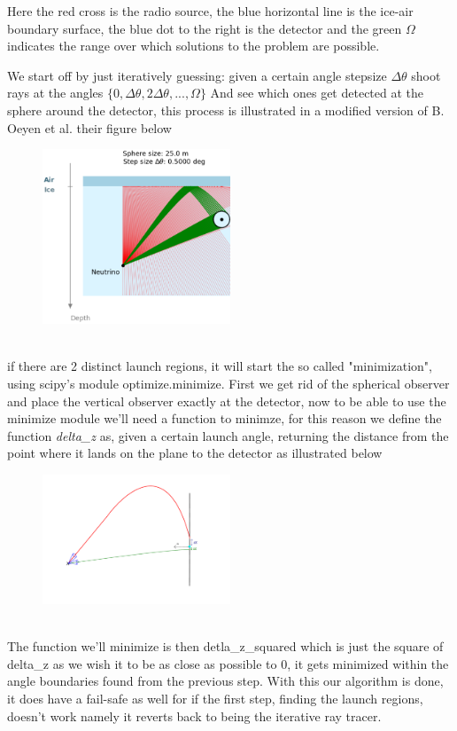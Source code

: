 \documentclass[11pt,a4paper,faculty=we,language=en,doctype=report]{cls/ugent-doc}
\begin{document}
Here the red cross is the radio source, the blue horizontal line is the ice-air
boundary surface, the blue dot to the right is the detector and the green
$\Omega$ indicates the range over which solutions to the problem are possible.

We start off by just iteratively guessing: given a certain angle stepsize $\Delta \theta$ shoot rays
at the angles $\{0,\Delta \theta, 2\Delta \theta,...,\Omega\}$ And see which ones get detected 
at the sphere around the detector, this process is illustrated in a modified version of B. Oeyen
et al. their figure below\\
\begin{figure}[h!]
  \centering
  \includegraphics[width=0.5\textwidth]{begin_explanation.png}
\end{figure}\\
if there are 2 distinct launch regions, it will start the so called "minimization", using scipy's module 
optimize.minimize. First we get rid of the spherical observer and place the vertical observer exactly at
the detector, now
to be able to use the minimize module we'll need a function to minimze, for this reason we define the function 
\textit{delta\_z} as, given a certain launch angle, returning the distance from the point where it lands on the
plane to the detector as illustrated below
\begin{figure}[h!]
  \centering
  \includegraphics[width=0.5\textwidth]{PrincipleHybridIllu.pdf}
\end{figure}\\
The function we'll minimize is then detla\_z\_squared which is just the square of delta\_z as we wish it to be
as close as possible to 0, it gets minimized within the angle boundaries found from the previous step.
With this our algorithm is done, it does have a fail-safe as well for if the first step, finding the launch
regions, doesn't work namely it reverts back to being the iterative ray tracer.
\end{document}

